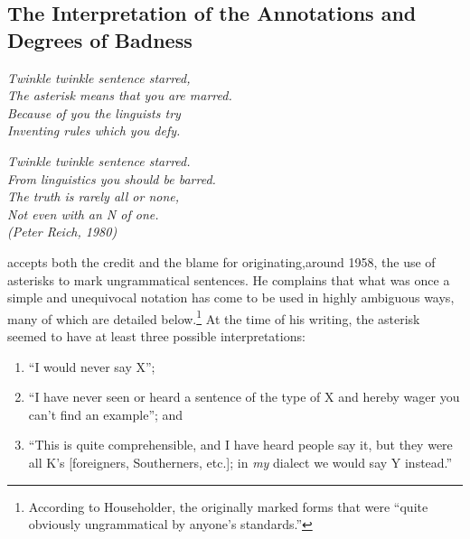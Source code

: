 \subsection{The Interpretation of the Annotations and Degrees of Badness}\label{sec:2.3.4}
\begin{flushright}
\itshape
Twinkle twinkle sentence starred,\\
The asterisk means that you are marred. \\
Because of you the linguists try \\
Inventing rules which you defy.\\
\end{flushright}
\begin{flushright}
\noindent\itshape Twinkle twinkle sentence starred.\\
From linguistics you should be barred.\\
The truth is rarely all or none,\\
Not even with an N of one.\\

\noindent\upshape (Peter Reich, 1980)\\
\end{flushright}

\citet{Householder1973} accepts both the credit and the blame for originating,\linebreak around 1958, the use of asterisks to mark ungrammatical sentences.  He complains that what was once a simple and unequivocal notation has come to be used in highly ambiguous ways, many of which are detailed below.\footnote{According to Householder, the  originally marked forms that were ``quite obviously ungrammatical by anyone's standards.''}
 At the time of his writing, the asterisk seemed to have at least three possible interpretations:

\begin{enumerate}
\item ``I would never say X'';

\item ``I have never seen or heard a sentence of the type of X and hereby wager you can't find an example''; and

\item ``This is quite comprehensible, and I have heard people say it, but they were all K's [foreigners, Southerners, etc.]; in \textit{my} dialect we would say Y instead.'' \citep[370\textendash{}372]{Householder1973}

\end{enumerate}


